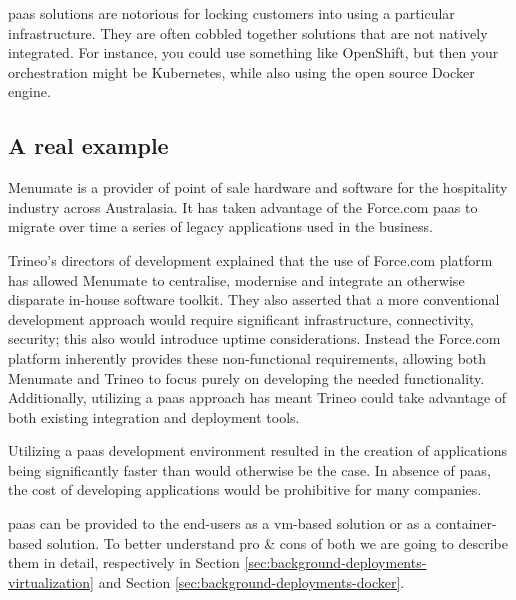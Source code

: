 \ac{paas} solutions are notorious for locking customers into using a particular infrastructure. They
are often cobbled together solutions that are not natively integrated. For instance, you could use
something like OpenShift, but then your orchestration might be Kubernetes, while also using the open
source Docker engine.

\subsection{A real example}
\label{sec:background-paas-realExample}
Menumate \cite{menumateCaseStudy} is a provider of point of sale hardware and software for the hospitality
industry across Australasia. It has taken advantage of the Force.com \ac{paas} to migrate over time a
series of legacy applications used in the business.

Trineo's \cite{trineoCaseStudy} directors of development explained that the use of Force.com platform has
allowed Menumate to centralise, modernise and integrate an otherwise disparate in-house software toolkit. 
They also asserted that a more conventional development approach would require significant infrastructure,
connectivity, security; this also would introduce uptime considerations. Instead the Force.com
platform inherently provides these non-functional requirements, allowing both Menumate and Trineo to
focus purely on developing the needed functionality. Additionally, utilizing a \ac{paas} approach
has meant Trineo could take advantage of both existing integration and deployment tools.

Utilizing a \ac{paas} development environment resulted in the creation of applications being
significantly faster than would otherwise be the case. In absence of \ac{paas}, the cost of developing
applications would be prohibitive for many companies.

\ac{paas} can be provided to the end-users as a \ac{vm}-based solution or as a container-based solution. To 
better understand pro \& cons of both we are going to describe them in detail, respectively in Section
\ref{sec:background-deployments-virtualization} and Section \ref{sec:background-deployments-docker}.